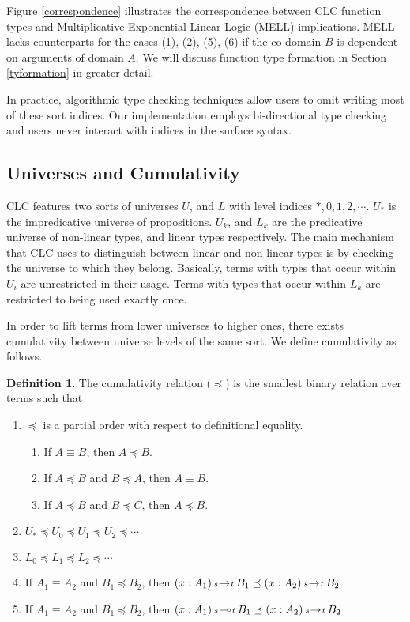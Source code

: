 \documentclass{article}
\theoremstyle{definition}
\newtheorem{definition}{Definition}[section]
\newcommand{\arw}[2]
{\hspace*{0.2em}{\scriptstyle #1}\hspace*{-0.2em}
\rightarrow
\hspace*{-0.2em}{\scriptstyle #2}\hspace*{0.2em}}
\newcommand{\lrw}[2]
{\hspace*{0.2em}{\scriptstyle #1}\hspace*{-0.2em}
\multimap
\hspace*{-0.2em}{\scriptstyle #2}\hspace*{0.2em}}
\begin{document}
  Figure \ref{correspondence} illustrates the correspondence between CLC function types and Multiplicative Exponential Linear Logic (MELL) implications. MELL lacks counterparts for the cases (1), (2), (5), (6) if the co-domain $B$ is dependent on arguments of domain $A$. We will discuss function type formation in Section \ref{tyformation} in greater detail.

  In practice, algorithmic type checking techniques allow users to omit writing most of these sort indices. Our implementation employs bi-directional type checking and users never interact with indices in the surface syntax.

  \subsection{Universes and Cumulativity}
  CLC features two sorts of universes $U$, and $L$ with level indices $*, 0, 1, 2, \cdots$. $U_*$ is the impredicative universe of propositions. $U_k$, and $L_k$ are the predicative universe of non-linear types, and linear types respectively. The main mechanism that CLC uses to distinguish between linear and non-linear types is by checking the universe to which they belong. Basically, terms with types that occur within $U_i$ are unrestricted in their usage. Terms with types that occur within $L_k$ are restricted to being used exactly once.

  In order to lift terms from lower universes to higher ones, there exists cumulativity between universe levels of the same sort. We define cumulativity as follows.

  \begin{definition}
    The cumulativity relation ($\preceq$) is the smallest binary relation over terms such that
    \begin{enumerate}
      \item $\preceq$ is a partial order with respect to definitional equality.
        \begin{enumerate}
          \item If $A \equiv B$, then $A \preceq B$.
          \item If $A \preceq B$ and $B \preceq A$, then $A \equiv B$.
          \item If $A \preceq B$ and $B \preceq C$, then $A \preceq B$.
        \end{enumerate}
      \item $U_* \preceq U_0 \preceq U_1 \preceq U_2 \preceq \cdots$
      \item $L_0 \preceq L_1 \preceq L_2 \preceq \cdots$
      \item If $A_1 \equiv A_2$ and $B_1 \preceq B_2$, then
        $(x : A_1) \arw{s}{t} B_1 \preceq (x : A_2) \arw{s}{t} B_2$
      \item If $A_1 \equiv A_2$ and $B_1 \preceq B_2$, then
        $(x : A_1) \lrw{s}{t} B_1 \preceq (x : A_2) \arw{s}{t} B_2$
    \end{enumerate}
  \end{definition}
\end{document}
